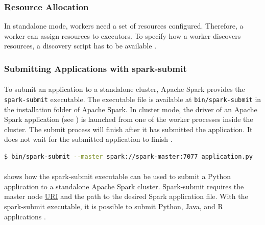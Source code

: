 \subsubsection{Resource Allocation}
\label{subsubsec:04_spark_standalone_res-alloc}
In standalone mode, workers need a set of resources configured. Therefore, a worker can assign resources to executors.
To specify how a worker discovers resources, a discovery script has to be available \cite{Apache2020Spark}.


\subsubsection{Submitting Applications with spark-submit}
\label{subsubsec:04_spark_standalone_submit}
\paragraph{}
To submit an application to a standalone cluster, Apache Spark provides the \texttt{spark-submit} executable. The executable file is available at \texttt{bin/spark-submit} in the installation folder of Apache Spark.
In cluster mode, the driver of an Apache Spark application (see ) is launched from one of the worker processes inside the cluster.
The submit process will finish after it has submitted the application. It does not wait for the submitted application to finish \cite{Apache2020Spark}.


\begin{lstlisting}[label=lst:04_spark_standalone_submit_example, caption=Example usage of the spark-submit executable, language=bash, numbers=none]
$ bin/spark-submit --master spark://spark-master:7077 application.py
\end{lstlisting}


\paragraph{}
 shows how the spark-submit executable can be used to submit a Python application to a standalone Apache Spark cluster.
Spark-submit requires the master node \hyperlink{abbr:uri}{URI} and the path to the desired Spark application file.
With the spark-submit executable, it is possible to submit Python, Java, and R applications \cite{Apache2020Spark}.


